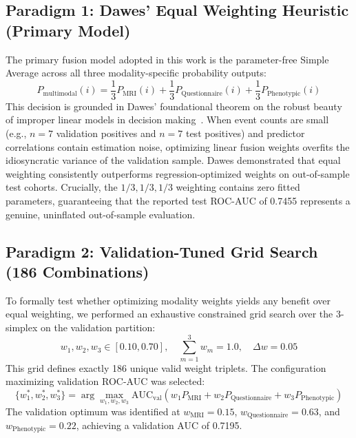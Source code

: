\documentclass[10pt,letterpaper]{article}
\begin{document}
        \subsection*{Paradigm 1: Dawes' Equal Weighting Heuristic (Primary Model)}
        The primary fusion model adopted in this work is the parameter-free Simple Average across all three modality-specific probability outputs:
        \begin{equation} \label{eq:simple_average}
        P_{\text{multimodal}}(i) = \frac{1}{3} P_{\text{MRI}}(i) + \frac{1}{3} P_{\text{Questionnaire}}(i) + \frac{1}{3} P_{\text{Phenotypic}}(i)
        \end{equation}
        This decision is grounded in Dawes' foundational theorem on the robust beauty of improper linear models in decision making~\cite{ref_dawes}. When event counts are small (e.g., $n=7$ validation positives and $n=7$ test positives) and predictor correlations contain estimation noise, optimizing linear fusion weights overfits the idiosyncratic variance of the validation sample. Dawes demonstrated that equal weighting consistently outperforms regression-optimized weights on out-of-sample test cohorts. Crucially, the $1/3, 1/3, 1/3$ weighting contains zero fitted parameters, guaranteeing that the reported test ROC-AUC of 0.7455 represents a genuine, uninflated out-of-sample evaluation.

        \subsection*{Paradigm 2: Validation-Tuned Grid Search (186 Combinations)}
        To formally test whether optimizing modality weights yields any benefit over equal weighting, we performed an exhaustive constrained grid search over the 3-simplex on the validation partition:
        \begin{equation} \label{eq:grid_weights}
        w_1, w_2, w_3 \in [0.10, 0.70],\quad \sum_{m=1}^3 w_m = 1.0,\quad \Delta w = 0.05
        \end{equation}
        This grid defines exactly 186 unique valid weight triplets. The configuration maximizing validation ROC-AUC was selected:
        \begin{equation} \label{eq:grid_opt}
        \{w_1^*, w_2^*, w_3^*\} = \arg\max_{w_1, w_2, w_3} \text{AUC}_{\text{val}}(w_1 P_{\text{MRI}} + w_2 P_{\text{Questionnaire}} + w_3 P_{\text{Phenotypic}})
        \end{equation}
        The validation optimum was identified at $w_{\text{MRI}} = 0.15$, $w_{\text{Questionnaire}} = 0.63$, and $w_{\text{Phenotypic}} = 0.22$, achieving a validation AUC of 0.7195.
\end{document}
